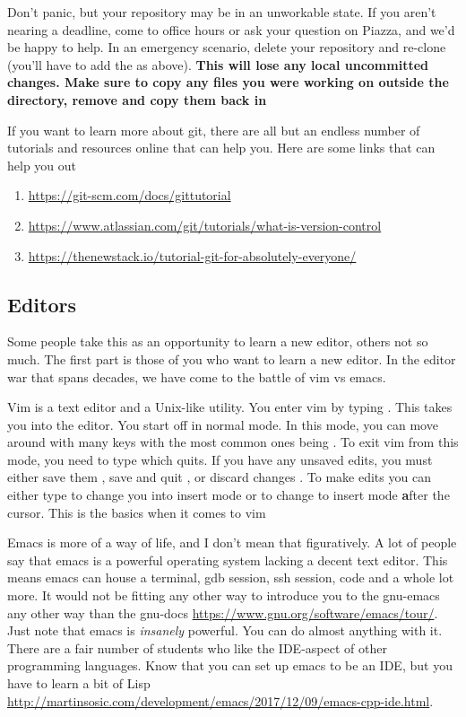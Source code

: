 Don't panic, but your repository may be in an unworkable state.
If you aren't nearing a deadline, come to office hours or ask your question on Piazza, and we'd be happy to help.
In an emergency scenario, delete your repository and re-clone (you'll have to add the  as above).
\textbf{This will lose any local uncommitted changes. Make sure to copy any files you were working on outside the directory, remove and copy them back in}

If you want to learn more about git, there are all but an endless number of tutorials and resources online that can help you.
Here are some links that can help you out

\begin{enumerate}
\item \url{https://git-scm.com/docs/gittutorial}
\item \url{https://www.atlassian.com/git/tutorials/what-is-version-control}
\item \url{https://thenewstack.io/tutorial-git-for-absolutely-everyone/}
\end{enumerate}

\subsection{Editors}

Some people take this as an opportunity to learn a new editor, others not so much. The first part is those of you who want to learn a new editor. In the editor war that spans decades, we have come to the battle of vim vs emacs.

Vim is a text editor and a Unix-like utility.
You enter vim by typing .
This takes you into the editor.
You start off in normal mode.
In this mode, you can move around with many keys with the most common ones being .
To exit vim from this mode, you need to type  which quits.
If you have any unsaved edits, you must either save them , save and quit , or discard changes . To make edits you can either type  to change you into insert mode or  to change to insert mode \textbf{a}fter the cursor. This is the basics when it comes to vim

Emacs is more of a way of life, and I don't mean that figuratively.
A lot of people say that emacs is a powerful operating system lacking a decent text editor.
This means emacs can house a terminal, gdb session, ssh session, code and a whole lot more.
It would not be fitting any other way to introduce you to the gnu-emacs any other way than the gnu-docs \url{https://www.gnu.org/software/emacs/tour/}.
Just note that emacs is \textit{insanely} powerful.
You can do almost anything with it.
There are a fair number of students who like the IDE-aspect of other programming languages.
Know that you can set up emacs to be an IDE, but you have to learn a bit of Lisp \url{http://martinsosic.com/development/emacs/2017/12/09/emacs-cpp-ide.html}.

